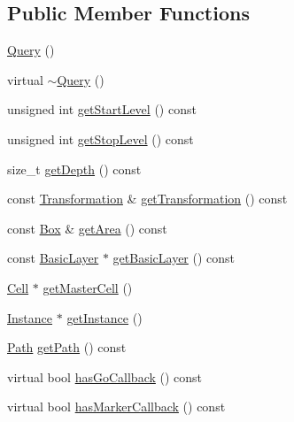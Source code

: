 \subsection*{Public Member Functions}
\begin{DoxyCompactItemize}
\item 
\mbox{\hyperlink{classHurricane_1_1Query_a999eaaaf34672fb056df14629d3197d1}{Query}} ()
\item 
virtual \mbox{\hyperlink{classHurricane_1_1Query_acd18d98c6bf30dd049916508a397391a}{$\sim$\+Query}} ()
\item 
unsigned int \mbox{\hyperlink{classHurricane_1_1Query_a7aac7fbdc96df19e7249bf8993eb355f}{get\+Start\+Level}} () const
\item 
unsigned int \mbox{\hyperlink{classHurricane_1_1Query_a3544d22dbb0685208c590cef09412796}{get\+Stop\+Level}} () const
\item 
size\+\_\+t \mbox{\hyperlink{classHurricane_1_1Query_afb81080617e5b4d3c2bedf1bf8b2ebd8}{get\+Depth}} () const
\item 
const \mbox{\hyperlink{classHurricane_1_1Transformation}{Transformation}} \& \mbox{\hyperlink{classHurricane_1_1Query_aabe2c0588f95c30a3acfec8fed269be4}{get\+Transformation}} () const
\item 
const \mbox{\hyperlink{classHurricane_1_1Box}{Box}} \& \mbox{\hyperlink{classHurricane_1_1Query_a666c44432d3f5717f2fee5f57a281bdd}{get\+Area}} () const
\item 
const \mbox{\hyperlink{classHurricane_1_1BasicLayer}{Basic\+Layer}} $\ast$ \mbox{\hyperlink{classHurricane_1_1Query_ac683152bccef813184e572806e4c14f4}{get\+Basic\+Layer}} () const
\item 
\mbox{\hyperlink{classHurricane_1_1Cell}{Cell}} $\ast$ \mbox{\hyperlink{classHurricane_1_1Query_add13f7ff193df6ce5223f9761b6cba69}{get\+Master\+Cell}} ()
\item 
\mbox{\hyperlink{classHurricane_1_1Instance}{Instance}} $\ast$ \mbox{\hyperlink{classHurricane_1_1Query_a459b9f175f77fce91963eeb192c6e018}{get\+Instance}} ()
\item 
\mbox{\hyperlink{classHurricane_1_1Path}{Path}} \mbox{\hyperlink{classHurricane_1_1Query_ae6be93b35a9174b2e7b656853f450021}{get\+Path}} () const
\item 
virtual bool \mbox{\hyperlink{classHurricane_1_1Query_aeff0c9c1ef8b787a3f1460ea55db2947}{has\+Go\+Callback}} () const
\item 
virtual bool \mbox{\hyperlink{classHurricane_1_1Query_a4f121b05f722a661b88bb8a0dc981024}{has\+Marker\+Callback}} () const

\end{DoxyCompactItemize}
